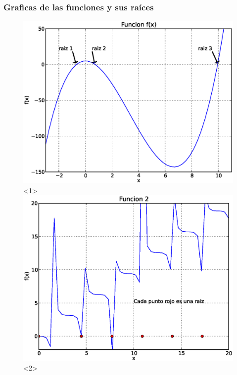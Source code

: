 \begin{frame}
\frametitle{Graficas de las funciones y sus raíces}
\begin{figure}
	\centering
	\includegraphics[scale=0.4]{Imagenes/ejercicio1_Biseccion.eps}<1>
	\includegraphics[scale=0.4]{Imagenes/ejercicio2_Biseccion.eps}<2>
\end{figure}
\end{frame}

